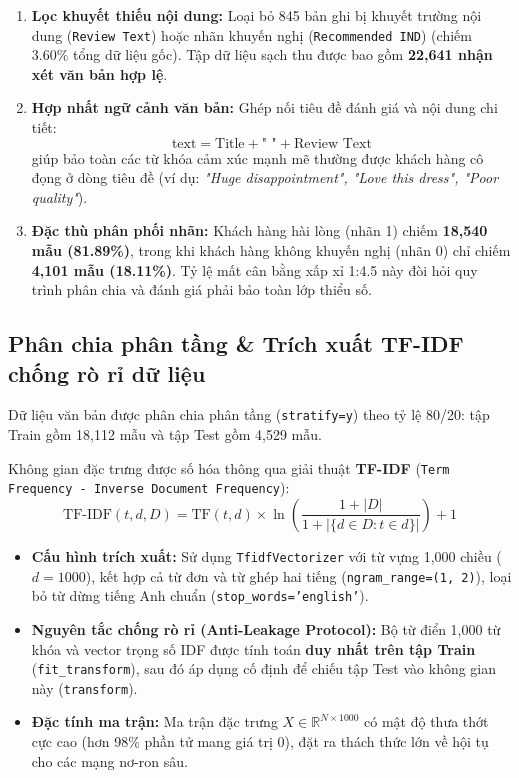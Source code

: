 \documentclass[12pt,a4paper]{report}
\begin{document}
\begin{enumerate}
    \item \textbf{Lọc khuyết thiếu nội dung:} Loại bỏ 845 bản ghi bị khuyết trường nội dung (\texttt{Review Text}) hoặc nhãn khuyến nghị (\texttt{Recommended IND}) (chiếm 3.60\% tổng dữ liệu gốc). Tập dữ liệu sạch thu được bao gồm \textbf{22,641 nhận xét văn bản hợp lệ}.
    \item \textbf{Hợp nhất ngữ cảnh văn bản:} Ghép nối tiêu đề đánh giá và nội dung chi tiết:
    \begin{equation}
        \text{text} = \text{Title} + \text{" "} + \text{Review Text}
    \end{equation}
    giúp bảo toàn các từ khóa cảm xúc mạnh mẽ thường được khách hàng cô đọng ở dòng tiêu đề (ví dụ: \textit{"Huge disappointment", "Love this dress", "Poor quality"}).
    \item \textbf{Đặc thù phân phối nhãn:} Khách hàng hài lòng (nhãn 1) chiếm \textbf{18,540 mẫu (81.89\%)}, trong khi khách hàng không khuyến nghị (nhãn 0) chỉ chiếm \textbf{4,101 mẫu (18.11\%)}. Tỷ lệ mất cân bằng xấp xỉ 1:4.5 này đòi hỏi quy trình phân chia và đánh giá phải bảo toàn lớp thiểu số.
\end{enumerate}

\subsection{Phân chia phân tầng \& Trích xuất TF-IDF chống rò rỉ dữ liệu}
Dữ liệu văn bản được phân chia phân tầng (\texttt{stratify=y}) theo tỷ lệ 80/20: tập Train gồm 18,112 mẫu và tập Test gồm 4,529 mẫu. 

Không gian đặc trưng được số hóa thông qua giải thuật \textbf{TF-IDF} (\texttt{Term Frequency - Inverse Document Frequency}):
\begin{equation}
    \text{TF-IDF}(t, d, D) = \text{TF}(t, d) \times \ln\left( \frac{1 + |D|}{1 + |\{d \in D : t \in d\}|} \right) + 1
\end{equation}
\begin{itemize}
    \item \textbf{Cấu hình trích xuất:} Sử dụng \texttt{TfidfVectorizer} với từ vựng 1,000 chiều ($d = 1000$), kết hợp cả từ đơn và từ ghép hai tiếng (\texttt{ngram\_range=(1, 2)}), loại bỏ từ dừng tiếng Anh chuẩn (\texttt{stop\_words='english'}).
    \item \textbf{Nguyên tắc chống rò rỉ (Anti-Leakage Protocol):} Bộ từ điển 1,000 từ khóa và vector trọng số IDF được tính toán \textbf{duy nhất trên tập Train} (\texttt{fit\_transform}), sau đó áp dụng cố định để chiếu tập Test vào không gian này (\texttt{transform}).
    \item \textbf{Đặc tính ma trận:} Ma trận đặc trưng $X \in \mathbb{R}^{N \times 1000}$ có mật độ thưa thớt cực cao (hơn 98\% phần tử mang giá trị 0), đặt ra thách thức lớn về hội tụ cho các mạng nơ-ron sâu.
\end{itemize}
\end{document}
